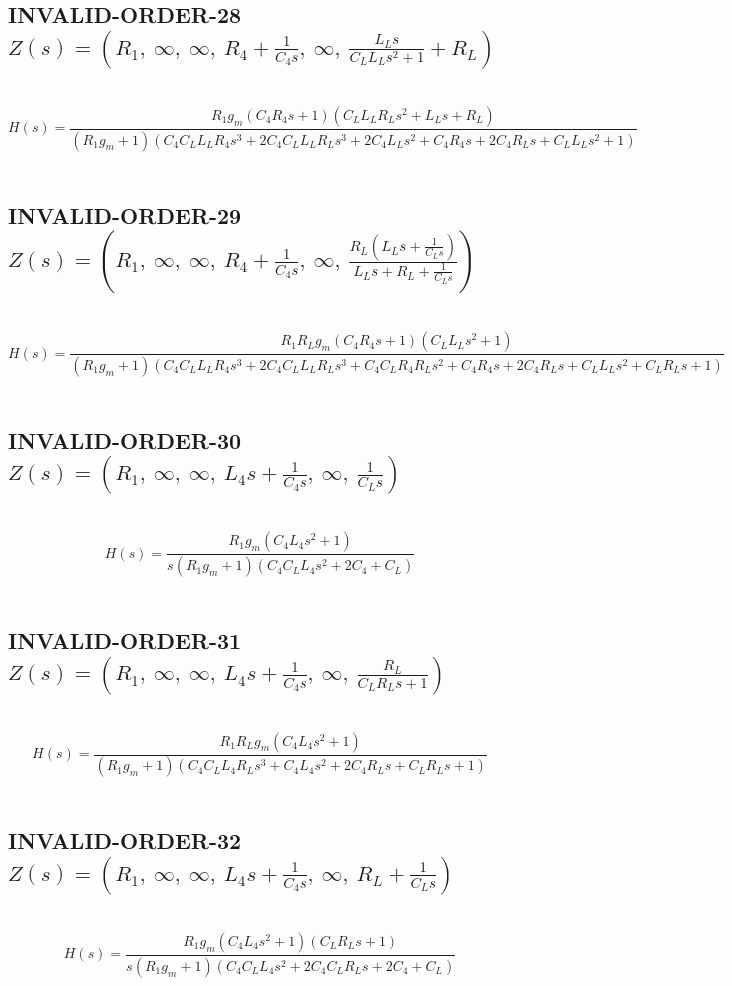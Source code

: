 \documentclass{article}
\begin{document}
\subsection{INVALID-ORDER-28 $Z(s) = \left( R_{1}, \  \infty, \  \infty, \  R_{4} + \frac{1}{C_{4} s}, \  \infty, \  \frac{L_{L} s}{C_{L} L_{L} s^{2} + 1} + R_{L}\right)$ } \ 
\textbf{\[H(s) = \frac{R_{1} g_{m} \left(C_{4} R_{4} s + 1\right) \left(C_{L} L_{L} R_{L} s^{2} + L_{L} s + R_{L}\right)}{\left(R_{1} g_{m} + 1\right) \left(C_{4} C_{L} L_{L} R_{4} s^{3} + 2 C_{4} C_{L} L_{L} R_{L} s^{3} + 2 C_{4} L_{L} s^{2} + C_{4} R_{4} s + 2 C_{4} R_{L} s + C_{L} L_{L} s^{2} + 1\right)}\] } \ 
\subsection{INVALID-ORDER-29 $Z(s) = \left( R_{1}, \  \infty, \  \infty, \  R_{4} + \frac{1}{C_{4} s}, \  \infty, \  \frac{R_{L} \left(L_{L} s + \frac{1}{C_{L} s}\right)}{L_{L} s + R_{L} + \frac{1}{C_{L} s}}\right)$ } \ 
\textbf{\[H(s) = \frac{R_{1} R_{L} g_{m} \left(C_{4} R_{4} s + 1\right) \left(C_{L} L_{L} s^{2} + 1\right)}{\left(R_{1} g_{m} + 1\right) \left(C_{4} C_{L} L_{L} R_{4} s^{3} + 2 C_{4} C_{L} L_{L} R_{L} s^{3} + C_{4} C_{L} R_{4} R_{L} s^{2} + C_{4} R_{4} s + 2 C_{4} R_{L} s + C_{L} L_{L} s^{2} + C_{L} R_{L} s + 1\right)}\] } \ 
\subsection{INVALID-ORDER-30 $Z(s) = \left( R_{1}, \  \infty, \  \infty, \  L_{4} s + \frac{1}{C_{4} s}, \  \infty, \  \frac{1}{C_{L} s}\right)$ } \ 
\textbf{\[H(s) = \frac{R_{1} g_{m} \left(C_{4} L_{4} s^{2} + 1\right)}{s \left(R_{1} g_{m} + 1\right) \left(C_{4} C_{L} L_{4} s^{2} + 2 C_{4} + C_{L}\right)}\] } \ 
\subsection{INVALID-ORDER-31 $Z(s) = \left( R_{1}, \  \infty, \  \infty, \  L_{4} s + \frac{1}{C_{4} s}, \  \infty, \  \frac{R_{L}}{C_{L} R_{L} s + 1}\right)$ } \ 
\textbf{\[H(s) = \frac{R_{1} R_{L} g_{m} \left(C_{4} L_{4} s^{2} + 1\right)}{\left(R_{1} g_{m} + 1\right) \left(C_{4} C_{L} L_{4} R_{L} s^{3} + C_{4} L_{4} s^{2} + 2 C_{4} R_{L} s + C_{L} R_{L} s + 1\right)}\] } \ 
\subsection{INVALID-ORDER-32 $Z(s) = \left( R_{1}, \  \infty, \  \infty, \  L_{4} s + \frac{1}{C_{4} s}, \  \infty, \  R_{L} + \frac{1}{C_{L} s}\right)$ } \ 
\textbf{\[H(s) = \frac{R_{1} g_{m} \left(C_{4} L_{4} s^{2} + 1\right) \left(C_{L} R_{L} s + 1\right)}{s \left(R_{1} g_{m} + 1\right) \left(C_{4} C_{L} L_{4} s^{2} + 2 C_{4} C_{L} R_{L} s + 2 C_{4} + C_{L}\right)}\] } \ 
\end{document}
